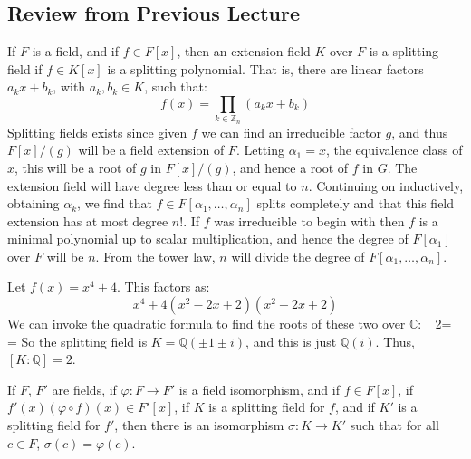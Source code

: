 \documentclass{article}                                                        %
\begin{document}
        \subsection{Review from Previous Lecture}
            If $F$ is a field, and if $f\in{F}[x]$, then an extension field
            $K$ over $F$ is a splitting field if $f\in{K}[x]$ is a splitting
            polynomial. That is, there are linear factors
            $a_{k}x+b_{k}$, with $a_{k},b_{k}\in{K}$, such that:
            \begin{equation}
                f(x)=\prod_{k\in\mathbb{Z}_{n}}(a_{k}x+b_{k})
            \end{equation}
            Splitting fields exists since given $f$ we can find an irreducible
            factor $g$, and thus $F[x]/(g)$ will be a field extension of $F$.
            Letting $\alpha_{1}=\overline{x}$, the equivalence class of $x$,
            this will be a root of $g$ in $F[x]/(g)$, and hence a root of
            $f$ in $G$. The extension field will have degree less than or equal
            to $n$. Continuing on inductively, obtaining $\alpha_{k}$, we find
            that $f\in{F}[\alpha_{1},\dots,\alpha_{n}]$ splits completely and
            that this field extension has at most degree $n!$. If $f$ was
            irreducible to begin with then $f$ is a minimal polynomial up to
            scalar multiplication, and hence the degree of $F[\alpha_{1}]$ over
            $F$ will be $n$. From the tower law, $n$ will divide the degree of
            $F[\alpha_{1},\dots,\alpha_{n}]$.
            \begin{example}
                Let $f(x)=x^{4}+4$. This factors as:
                \begin{equation}
                    x^{4}+4(x^{2}-2x+2)(x^{2}+2x+2)
                \end{equation}
                We can invoke the quadratic formula to find the roots of these
                two over $\mathbb{C}$:
                {
                    \alpha_{2}=
                              =
                }
                So the splitting field is $K=\mathbb{Q}(\pm{1}\pm{i})$, and this
                is just $\mathbb{Q}(i)$. Thus, $[K:\mathbb{Q}]=2$.
            \end{example}
            \begin{theorem}
                If $F$, $F'$ are fields, if $\varphi:F\rightarrow{F}'$ is
                a field isomorphism, and if $f\in{F}[x]$, if
                $f'(x)(\varphi\circ{f})(x)\in{F}'[x]$, if $K$ is a splitting
                field for $f$, and if $K'$ is a splitting field for
                $f'$, then there is an isomorphism $\sigma:K\rightarrow{K}'$
                such that for all $c\in{F}$, $\sigma(c)=\varphi(c)$.
            \end{theorem}
\end{document}
